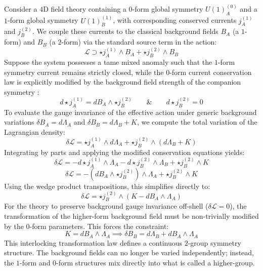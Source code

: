 \documentclass[aps,preprint,nofootinbib,preprintnumbers,eqsecnum,superscriptaddress]{revtex4}
\numberwithin{equation}{section}
\begin{document}
Consider a $4\text{D}$ field theory containing a $0$-form global symmetry $U(1)_A^{(0)}$ and a $1$-form global symmetry $U(1)_B^{(1)}$, with corresponding conserved currents $j^{(1)}_A$ and $j^{(2)}_B$. We couple these currents to the classical background fields $B_A$ (a $1$-form) and $B_B$ (a $2$-form) via the standard source term in the action:
\begin{equation}
    \mathcal{L} \supset \star j^{(1)}_A \wedge B_A + \star j^{(2)}_B \wedge B_B
\end{equation}
Suppose the system possesses a tame mixed anomaly such that the $1$-form symmetry current remains strictly closed, while the $0$-form current conservation law is explicitly modified by the background field strength of the companion symmetry \cite{Antinucci_2025}:
\begin{equation}
    d\star j^{(1)}_A = dB_A \wedge \star j^{(2)}_B \qquad \& \qquad d\star j^{(2)}_B = 0
\end{equation}
To evaluate the gauge invariance of the effective action under generic background variations $\delta B_A = d\Lambda_A$ and $\delta B_B = d\Lambda_B + K$, we compute the total variation of the Lagrangian density:
\begin{equation}
    \delta \mathcal{L} = \star j^{(1)}_A \wedge d\Lambda_A + \star j^{(2)}_B \wedge (d\Lambda_B + K)
\end{equation}
Integrating by parts and applying the modified conservation equations yields:
\begin{equation}
    \delta \mathcal{L} = -d\star j^{(1)}_A \wedge \Lambda_A - d\star j^{(2)}_B \wedge \Lambda_B + \star j^{(2)}_B \wedge K
\end{equation}
\begin{equation}
    \delta \mathcal{L} = -(dB_A \wedge \star j^{(2)}_B) \wedge \Lambda_A + \star j^{(2)}_B \wedge K
\end{equation}
Using the wedge product transpositions, this simplifies directly to:
\begin{equation}
    \delta \mathcal{L} = \star j^{(2)}_B \wedge \left( K - dB_A \wedge \Lambda_A \right)
\end{equation}
For the theory to preserve background gauge invariance off-shell ($\delta \mathcal{L} = 0$), the transformation of the higher-form background field must be non-trivially modified by the $0$-form parameters. This forces the constraint:
\begin{equation}
    K = dB_A \wedge \Lambda_A \implies \delta B_B = d\Lambda_B + dB_A \wedge \Lambda_A
\end{equation}
This interlocking transformation law defines a continuous $2$-group symmetry structure. The background fields can no longer be varied independently; instead, the $1$-form and $0$-form structures mix directly into what is called a higher-group.
\end{document}
